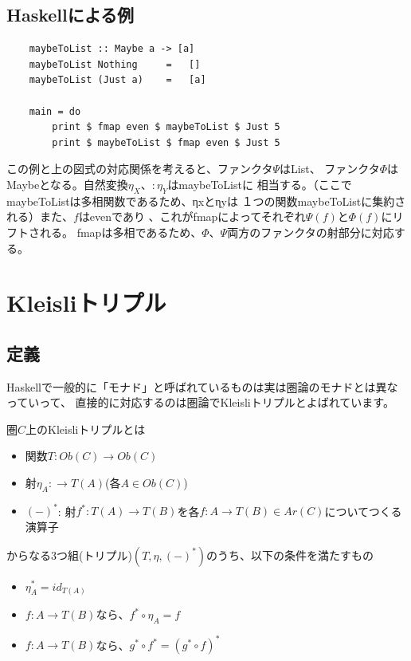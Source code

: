 \documentclass{jsarticle}
\begin{document}
\subsection{Haskellによる例}
\begin{lstlisting}
    maybeToList :: Maybe a -> [a]
    maybeToList Nothing     =   []
    maybeToList (Just a)    =   [a]

    main = do
        print $ fmap even $ maybeToList $ Just 5
        print $ maybeToList $ fmap even $ Just 5
\end{lstlisting}
この例と上の図式の対応関係を考えると、ファンクタ$\Psi$はList、
ファンクタ$\Phi$はMaybeとなる。自然変換$\eta_X$、$:\eta_Y$はmaybeToListに
相当する。（ここでmaybeToListは多相関数であるため、ηxとηyは
１つの関数maybeToListに集約される）また、$f$はevenであり
、これがfmapによってそれぞれ$\Psi(f)$と$\Phi(f)$にリフトされる。
fmapは多相であるため、$\Phi$、$\Psi$両方のファンクタの射部分に対応する。

\newpage
\section{Kleisliトリプル}

\subsection{定義}
Haskellで一般的に「モナド」と呼ばれているものは実は圏論のモナドとは異なっていって、
直接的に対応するのは圏論でKleisliトリプルとよばれています。

圏$C$上のKleisliトリプルとは
\begin{itemize}
    \item 関数$T:Ob(C)\to Ob(C)$
    \item 射$\eta_A:\to T(A)$(各$A\in Ob(C)$)
    \item $(-)^*$: 射$f^*:T(A)\to T(B)$を各$f:A\to T(B)\in Ar(C)$についてつくる演算子
\end{itemize}
からなる3つ組(トリプル)$(T, \eta, (-)^*)$のうち、以下の条件を満たすもの
\begin{itemize}
    \item $\eta_A^*=id_{T(A)}$
    \item $f:A\to T(B)$なら、$f^*\circ \eta_A=f$
    \item $f:A\to T(B)$なら、$g^*\circ f^*=(g^*\circ f)^*$
\end{itemize}
\end{document}
